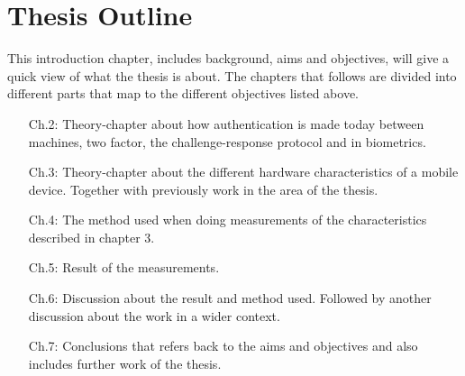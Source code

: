 \section{Thesis Outline}\label{sec:outline}
This introduction chapter, includes background, aims and objectives, will give a quick view of what the thesis is about. The chapters that follows are divided into different parts that map to the different objectives listed above.
\begin{itemize}
	\item[Ch.2:]	Theory-chapter about how authentication is made today between machines, two factor, the challenge-response protocol and in biometrics.
	\item[Ch.3:]	Theory-chapter about the different hardware characteristics of a mobile device. Together with previously work in the area of the thesis.
	\item[Ch.4:]	The method used when doing measurements of the characteristics described in chapter 3.
	\item[Ch.5:]	Result of the measurements.
	\item[Ch.6:]	Discussion about the result and method used. Followed by another discussion about the work in a wider context.
	\item[Ch.7:]	Conclusions that refers back to the aims and objectives and also includes further work of the thesis.
\end{itemize}